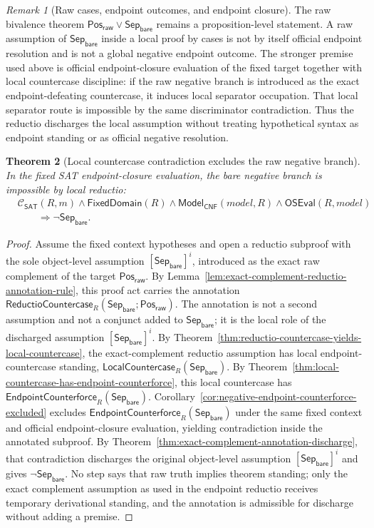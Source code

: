 \documentclass[11pt]{article}
\newtheorem{theorem}{Theorem}[section]
\theoremstyle{definition}
\theoremstyle{remark}
\newtheorem{remark}[theorem]{Remark}
\newcommand{\PosRaw}{\mathsf{Pos}_{\mathsf{raw}}}
\newcommand{\SepBare}{\mathsf{Sep}_{\mathsf{bare}}}
\newcommand{\ClayCtx}{\mathcal{C}_{\mathsf{SAT}}(R,m)}
\newcommand{\FixedDom}{\mathsf{FixedDomain}}
\newcommand{\ModelOfCnf}{\mathsf{Model}_{\mathsf{CNF}}}
\newcommand{\OfficialSATEval}{\mathsf{OSEval}}
\newcommand{\EndpointCounterforce}{\mathsf{EndpointCounterforce}}
\newcommand{\LocalCountercase}{\mathsf{LocalCountercase}}
\newcommand{\ReductioCountercase}{\mathsf{ReductioCountercase}}
\begin{document}
\begin{remark}[Raw cases, endpoint outcomes, and endpoint closure]
\label{rem:raw-cases-versus-endpoint-outcomes}
The raw bivalence theorem \(\PosRaw\vee\SepBare\) remains a proposition-level statement. A raw assumption of \(\SepBare\) inside a local proof by cases is not by itself official endpoint resolution and is not a global negative endpoint outcome. The stronger premise used above is official endpoint-closure evaluation of the fixed target together with local countercase discipline: if the raw negative branch is introduced as the exact endpoint-defeating countercase, it induces local separator occupation. That local separator route is impossible by the same discriminator contradiction. Thus the reductio discharges the local assumption without treating hypothetical syntax as endpoint standing or as official negative resolution.
\end{remark}



\begin{theorem}[Local countercase contradiction excludes the raw negative branch]
\label{thm:local-countercase-contradiction-excludes-raw-negative}
In the fixed SAT endpoint-closure evaluation, the bare negative branch is impossible by local reductio:
\[
\begin{aligned}
  &\ClayCtx\wedge\FixedDom(R)\wedge\ModelOfCnf(model,R)\wedge\OfficialSATEval(R,model)\\
  &\qquad\Rightarrow \neg\SepBare.
\end{aligned}
\]
\end{theorem}

\begin{proof}
Assume the fixed context hypotheses and open a reductio subproof with the sole object-level assumption \([\SepBare]^i\), introduced as the exact raw complement of the target \(\PosRaw\). By Lemma~\ref{lem:exact-complement-reductio-annotation-rule}, this proof act carries the annotation \(\ReductioCountercase_R(\SepBare;\PosRaw)\). The annotation is not a second assumption and not a conjunct added to \(\SepBare\); it is the local role of the discharged assumption \([\SepBare]^i\). By Theorem~\ref{thm:reductio-countercase-yields-local-countercase}, the exact-complement reductio assumption has local endpoint-countercase standing, \(\LocalCountercase_R(\SepBare)\). By Theorem~\ref{thm:local-countercase-has-endpoint-counterforce}, this local countercase has \(\EndpointCounterforce_R(\SepBare)\). Corollary~\ref{cor:negative-endpoint-counterforce-excluded} excludes \(\EndpointCounterforce_R(\SepBare)\) under the same fixed context and official endpoint-closure evaluation, yielding contradiction inside the annotated subproof. By Theorem~\ref{thm:exact-complement-annotation-discharge}, that contradiction discharges the original object-level assumption \([\SepBare]^i\) and gives \(\neg\SepBare\). No step says that raw truth implies theorem standing; only the exact complement assumption as used in the endpoint reductio receives temporary derivational standing, and the annotation is admissible for discharge without adding a premise.
\end{proof}
\end{document}
